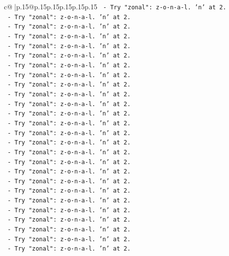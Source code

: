 \documentclass{article}
\begin{document}
{\begin{supertabular}{c@{$\;$}|p{.15\linewidth}@{}p{.15\linewidth}p{.15\linewidth}p{.15\linewidth}p{.15\linewidth}p{.15\linewidth}}
{{{\texttt{   {-} Try "zonal": z{-}o{-}n{-}a{-}l. 'n' at 2.} \\
\texttt{   {-} Try "zonal": z{-}o{-}n{-}a{-}l. 'n' at 2.} \\
\texttt{   {-} Try "zonal": z{-}o{-}n{-}a{-}l. 'n' at 2.} \\
\texttt{   {-} Try "zonal": z{-}o{-}n{-}a{-}l. 'n' at 2.} \\
\texttt{   {-} Try "zonal": z{-}o{-}n{-}a{-}l. 'n' at 2.} \\
\texttt{   {-} Try "zonal": z{-}o{-}n{-}a{-}l. 'n' at 2.} \\
\texttt{   {-} Try "zonal": z{-}o{-}n{-}a{-}l. 'n' at 2.} \\
\texttt{   {-} Try "zonal": z{-}o{-}n{-}a{-}l. 'n' at 2.} \\
\texttt{   {-} Try "zonal": z{-}o{-}n{-}a{-}l. 'n' at 2.} \\
\texttt{   {-} Try "zonal": z{-}o{-}n{-}a{-}l. 'n' at 2.} \\
\texttt{   {-} Try "zonal": z{-}o{-}n{-}a{-}l. 'n' at 2.} \\
\texttt{   {-} Try "zonal": z{-}o{-}n{-}a{-}l. 'n' at 2.} \\
\texttt{   {-} Try "zonal": z{-}o{-}n{-}a{-}l. 'n' at 2.} \\
\texttt{   {-} Try "zonal": z{-}o{-}n{-}a{-}l. 'n' at 2.} \\
\texttt{   {-} Try "zonal": z{-}o{-}n{-}a{-}l. 'n' at 2.} \\
\texttt{   {-} Try "zonal": z{-}o{-}n{-}a{-}l. 'n' at 2.} \\
\texttt{   {-} Try "zonal": z{-}o{-}n{-}a{-}l. 'n' at 2.} \\
\texttt{   {-} Try "zonal": z{-}o{-}n{-}a{-}l. 'n' at 2.} \\
\texttt{   {-} Try "zonal": z{-}o{-}n{-}a{-}l. 'n' at 2.} \\
\texttt{   {-} Try "zonal": z{-}o{-}n{-}a{-}l. 'n' at 2.} \\
\texttt{   {-} Try "zonal": z{-}o{-}n{-}a{-}l. 'n' at 2.} \\
\texttt{   {-} Try "zonal": z{-}o{-}n{-}a{-}l. 'n' at 2.} \\
\texttt{   {-} Try "zonal": z{-}o{-}n{-}a{-}l. 'n' at 2.} \\
\texttt{   {-} Try "zonal": z{-}o{-}n{-}a{-}l. 'n' at 2.} \\
\texttt{   {-} Try "zonal": z{-}o{-}n{-}a{-}l. 'n' at 2.} \\
\texttt{   {-} Try "zonal": z{-}o{-}n{-}a{-}l. 'n' at 2.} \\
}}}
\end{supertabular}}
\end{document}

